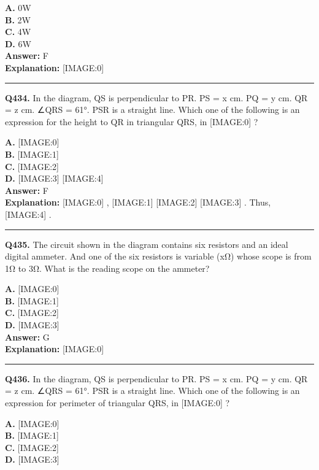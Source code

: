 \documentclass[12pt]{article}
\begin{document}
\textbf{A.} 0W \\
\textbf{B.} 2W \\
\textbf{C.} 4W \\
\textbf{D.} 6W \\

\textbf{Answer:} F \\
\textbf{Explanation:} [IMAGE:0]

\hrule
\vspace{1em}


\noindent
\textbf{Q434.} In the diagram, QS is perpendicular to PR. PS = x cm. PQ = y cm. QR = z cm. ∠QRS = 61°. PSR is a straight line.
Which one of the following is an expression for the height to QR in triangular QRS, in
[IMAGE:0]
?



\textbf{A.} [IMAGE:0] \\
\textbf{B.} [IMAGE:1] \\
\textbf{C.} [IMAGE:2] \\
\textbf{D.} [IMAGE:3]
[IMAGE:4] \\

\textbf{Answer:} F \\
\textbf{Explanation:} [IMAGE:0]
,
[IMAGE:1]
[IMAGE:2]
[IMAGE:3]
.
Thus,
[IMAGE:4]
.

\hrule
\vspace{1em}


\noindent
\textbf{Q435.} The circuit shown in the diagram contains six resistors and an ideal digital ammeter. And one of the six resistors is variable (xΩ) whose scope is from 1Ω to 3Ω.
What is the reading scope on the ammeter?



\textbf{A.} [IMAGE:0] \\
\textbf{B.} [IMAGE:1] \\
\textbf{C.} [IMAGE:2] \\
\textbf{D.} [IMAGE:3] \\

\textbf{Answer:} G \\
\textbf{Explanation:} [IMAGE:0]

\hrule
\vspace{1em}


\noindent
\textbf{Q436.} In the diagram, QS is perpendicular to PR. PS = x cm. PQ = y cm. QR = z cm. ∠QRS = 61°. PSR is a straight line.
Which one of the following is an expression for perimeter of triangular QRS, in
[IMAGE:0]
?



\textbf{A.} [IMAGE:0] \\
\textbf{B.} [IMAGE:1] \\
\textbf{C.} [IMAGE:2] \\
\textbf{D.} [IMAGE:3] \\
\end{document}
